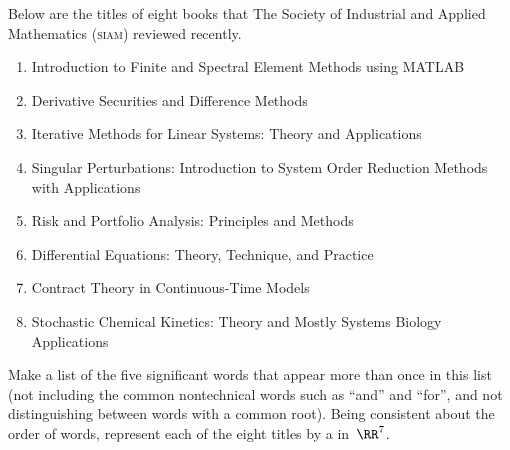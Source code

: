 \begin{exercise} \label{ex:8siambks} 
Below are the titles of eight books that The Society of Industrial and Applied Mathematics (\textsc{siam}) reviewed recently.
\begin{enumerate}
\item Introduction to Finite and Spectral Element Methods using MATLAB
\item Derivative Securities and Difference Methods 
\item Iterative Methods for Linear Systems: Theory and Applications 
\item Singular Perturbations: Introduction to System Order Reduction Methods with Applications 
\item Risk and Portfolio Analysis: Principles and Methods 
\item Differential Equations: Theory, Technique, and Practice 
\item Contract Theory in Continuous-Time Models 
\item Stochastic Chemical Kinetics: Theory and Mostly Systems Biology Applications
\end{enumerate}
Make a list of the five significant words that appear more than once in this list (not including the common nontechnical words such as ``and'' and ``for'', and not distinguishing between words with a common root).
Being consistent about the order of words, represent each of the eight titles by a  in~\(\RR^7\).

\end{exercise}




\begin{comment}%
why, what caused X?
how did X occur?
what-if? what-if-not?
how does X compare with Y?
what is the evidence for X?
why is X important?
\end{comment}





